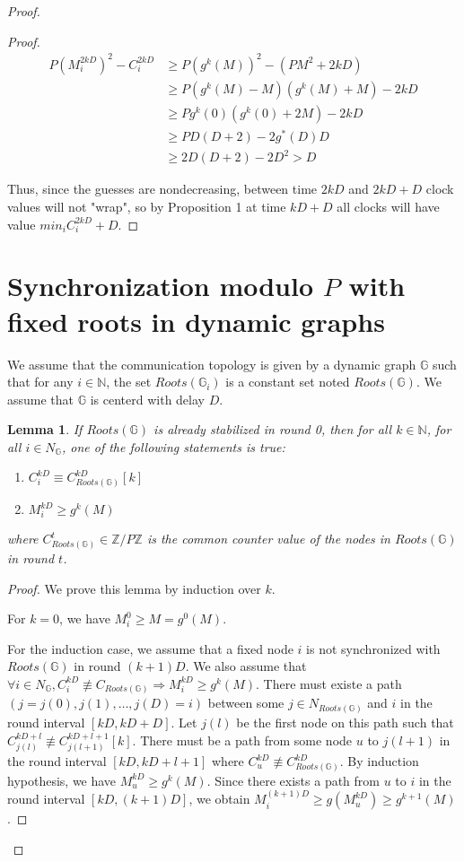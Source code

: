 \documentclass[11pt,letterpaper]{article}
\newtheorem{lem}[thm]{Lemma}
\begin{document}
\begin{proof}
\begin{proof}
	\begin{align*}
		P(M_i^{2kD})^2 - C_i^{2kD} & \geq P(g^k(M))^2-(PM^2+2kD) \\
		& \geq P(g^k(M)-M)(g^k(M)+M)-2kD \\
		& \geq Pg^k(0)(g^k(0)+2M)-2kD \\
		& \geq PD(D+2)-2g^*(D)D \\
		& \geq 2D(D+2)-2D^2 > D
	\end{align*}

	Thus, since the guesses are nondecreasing, between time $2kD$
	and $2kD + D$ clock values will not "wrap", so by Proposition 1
	at time $kD + D$ all clocks will have value $min_i C_i^{2kD}+D$.
\end{proof}

\section{Synchronization modulo $P$ with fixed roots in dynamic graphs}

We assume that the communication topology is given by a dynamic graph $\mathds{G}$
such that for any $i \in \mathds{N}$, the set $Roots(\mathds{G}_i)$ is a constant set noted $Roots(\mathds{G})$.
We assume that $\mathds{G}$ is centerd with delay $D$.

\begin{lem} \label{lem:croissant}
	If $Roots(\mathds{G})$ is already stabilized in round 0, then
	for all $k \in \mathds{N}$, for all $i \in N_\mathds{G}$,
	one of the following statements is true:
	\begin{enumerate}
		\item $C_i^{kD} \equiv C_{Roots(\mathds{G})}^{kD} [k]$
		\item $M_i^{kD} \geq g^{k}(M)$
	\end{enumerate}
	where $C_{Roots(\mathds{G})}^t \in \mathds{Z}/P\mathds{Z}$ is the common counter value of the nodes in $Roots(\mathds{G})$ in round $t$.
\end{lem}
\begin{proof}
	We prove this lemma by induction over $k$.

	For $k = 0$, we have $M^0_i \geq M = g^0(M)$.

	For the induction case, we assume that a fixed node $i$ is not synchronized with $Roots(\mathds{G})$ in round $(k+1)D$.
	We also assume that $\forall i \in N_\mathds{G}, C_i^{kD} \not\equiv C_{Roots(\mathds{G})} \Rightarrow M_i^{kD} \geq g^{k}(M)$.
	There must existe a path $(j = j(0), j(1), \dots, j(D) = i)$ between some $j \in N_{Roots(\mathds{G})}$ and $i$ in the round interval $[kD, kD+D]$.
	Let $j(l)$ be the first node on this path such that $C_{j(l)}^{kD+l} \not\equiv C_{j(l+1)}^{kD+l+1} [k]$.
	There must be a path from some node $u$ to $j(l+1)$ in the round interval $[kD, kD+l+1]$ where $C_u^{kD} \not\equiv C^{kD}_{Roots(\mathds{G})}$.
	By induction hypothesis, we have $M_u^{kD} \geq g^{k}(M)$.
	Since there exists a path from $u$ to $i$ in the round interval $[kD, (k+1)D]$,
	we obtain $M_i^{(k+1)D} \geq g(M_u^{kD}) \geq g^{k+1}(M)$.
\end{proof}


\end{proof}
\end{document}
